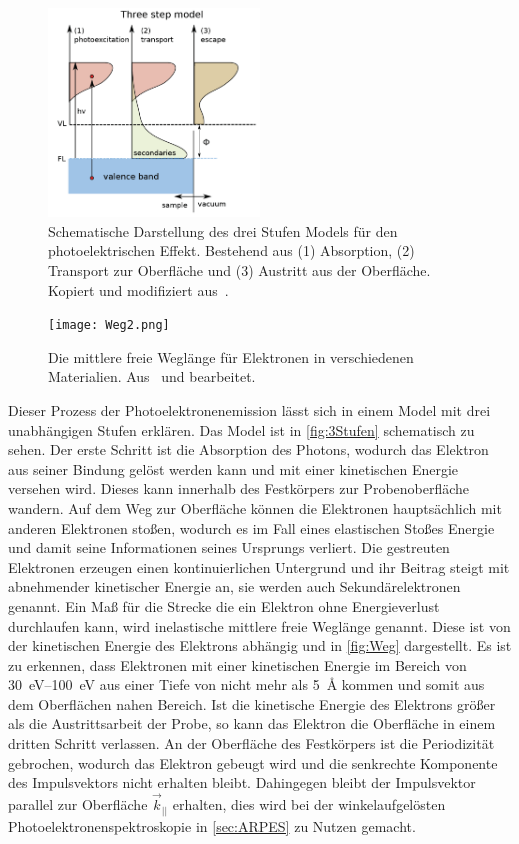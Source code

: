         \begin{figure}
            \centering
            \includegraphics[width=0.5\textwidth]{3Stufen}
            \caption{Schematische Darstellung des drei Stufen Models für den photoelektrischen Effekt.
            Bestehend aus (1) Absorption, (2) Transport zur Oberfläche und (3) Austritt aus der Oberfläche.
            Kopiert und modifiziert aus~\cite{zhang_synchrotron_2018}.}
            \label{fig:3Stufen}
        \end{figure}
        \begin{figure}
            \centering
            \texttt{[image: Weg2.png]}
            \caption{Die mittlere freie Weglänge für Elektronen in verschiedenen Materialien. Aus~\cite{Hüfner} und bearbeitet.}
            \label{fig:Weg}
        \end{figure}
        Dieser Prozess der Photoelektronenemission lässt sich in einem Model mit drei unabhängigen Stufen erklären.
        Das Model ist in \autoref{fig:3Stufen} schematisch zu sehen.
        Der erste Schritt ist die Absorption des Photons, wodurch das Elektron aus seiner Bindung gelöst werden kann und mit einer kinetischen Energie versehen wird.
        Dieses kann innerhalb des Festkörpers zur Probenoberfläche wandern.
        Auf dem Weg zur Oberfläche können die  Elektronen hauptsächlich mit anderen Elektronen stoßen, wodurch es im Fall eines elastischen Stoßes Energie und damit seine Informationen seines Ursprungs verliert.
        Die gestreuten Elektronen erzeugen einen kontinuierlichen Untergrund und ihr Beitrag steigt mit abnehmender kinetischer Energie an, sie werden auch Sekundärelektronen genannt.
        Ein Maß für die Strecke die ein Elektron ohne Energieverlust durchlaufen kann, wird inelastische mittlere freie Weglänge genannt.
        Diese ist von der kinetischen Energie des Elektrons abhängig und in \autoref{fig:Weg} dargestellt.
        Es ist zu erkennen, dass Elektronen mit einer kinetischen Energie im Bereich von \SIrange{30}{100}{\electronvolt} aus einer Tiefe von nicht mehr als \SI{5}{\angstrom} kommen und somit aus dem Oberflächen nahen Bereich.
        Ist die kinetische Energie des Elektrons größer als die Austrittsarbeit der Probe, so kann das Elektron die Oberfläche in einem dritten Schritt verlassen.
        An der Oberfläche des Festkörpers ist die Periodizität gebrochen, wodurch das Elektron gebeugt wird und die senkrechte Komponente des Impulsvektors nicht erhalten bleibt.
        Dahingegen bleibt der Impulsvektor parallel zur Oberfläche $\vec{k}_{||}$ erhalten, dies wird bei der winkelaufgelösten Photoelektronenspektroskopie in \autoref{sec:ARPES} zu Nutzen gemacht.

